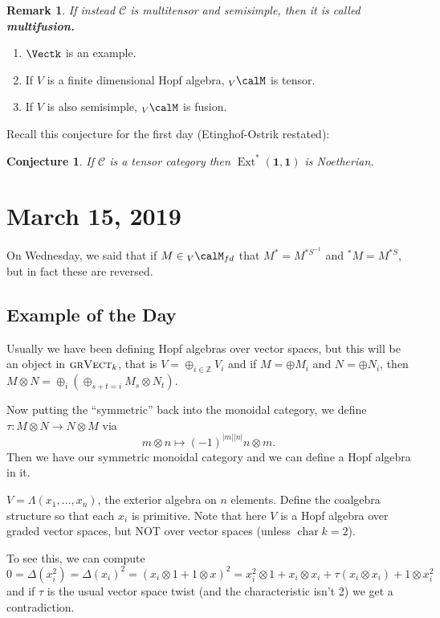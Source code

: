 \documentclass[12pt]{article}
\theoremstyle{break}
\theoremstyle{nonumberbreak}
\theoremstyle{changebreak}
\theoremstyle{break}
\theoremstyle{nonumberbreak}
\theoremstyle{nonumberplain}
\newtheorem{conj}{Conjecture}
\theoremstyle{change}
\newtheorem{rmk}[thm]{Remark}
\newcommand*{\Z}{
\mathbb{Z}
}
\DeclareMathOperator{\Ext}{Ext}
\DeclareMathOperator{\ch}{char}
\begin{document}
\begin{rmk}
	If instead $\mathscr C$ is multitensor and semisimple, then it is called \textbf{multifusion.}
\end{rmk}
\begin{ex}
	\begin{enumerate}
		\item $\Vectk$ is an example.
		\item If $V$ is a finite dimensional Hopf algebra, ${_V\calM}$ is tensor.
		\item If $V$ is also semisimple, ${_V\calM}$ is fusion.
	\end{enumerate}
\end{ex}
Recall this conjecture for the first day (Etinghof-Ostrik restated):
\begin{conj}
	If $\mathscr C$ is a tensor category then $\Ext^*(\mathbf{1},\mathbf{1})$ is Noetherian.
\end{conj}

\section{March 15, 2019}
On Wednesday, we said that if $M\in{_V\calM_{fd}}$ that $M^*=M^{*S^{-1}}$ and ${^*M}=M^{*S}$,
but in fact these are reversed.
\subsection{Example of the Day}
\begin{ex}
	Usually we have been defining Hopf algebras over vector spaces, but this will be an object in $\text{\sc grVect}_k$,
	that is $V=\oplus_{i\in\Z}V_i$ and if $M=\oplus M_i$ and $N=\oplus N_i$, then $M\otimes N=\oplus_i(\oplus_{s+t=i}M_s\otimes N_t)$.

	Now putting the ``symmetric'' back into the monoidal category, we define $\tau:M\otimes N\to N\otimes M$ via
	\[m\otimes n\mapsto (-1)^{|m||n|}n\otimes m.\]
	Then we have our symmetric monoidal category and we can define a Hopf algebra in it.

	$V=\Lambda(x_1,\dots,x_n)$, the exterior algebra on $n$ elements. Define the coalgebra structure 
	so that each $x_i$ is primitive. Note that here $V$ is a Hopf algebra over graded vector spaces, but 
	NOT over vector spaces (unless $\ch k=2$).

	To see this, we can compute 
	\[0=\Delta(x_i^2)=\Delta(x_i)^2=(x_i\otimes 1+1\otimes x)^2=x_i^2\otimes 1+x_i\otimes x_i+\tau(x_i\otimes x_i)+1\otimes x_i^2\]
	and if $\tau$ is the usual vector space twist (and the characteristic isn't 2) we get a contradiction.
\end{ex}
\end{document}
